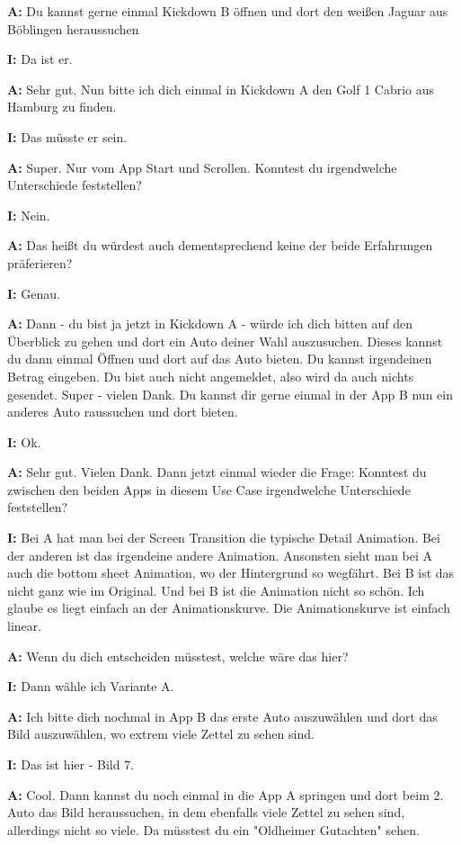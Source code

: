 \begin{myparindent}{0pt}
\textbf{A:} Du kannst gerne einmal Kickdown B öffnen und dort den weißen Jaguar aus Böblingen heraussuchen 

\textbf{I:} Da ist er. 

\textbf{A:} Sehr gut. Nun bitte ich dich einmal in Kickdown A den Golf 1 Cabrio aus Hamburg zu finden. 

\textbf{I:} Das müsste er sein. 

\textbf{A:} Super. Nur vom App Start und Scrollen. Konntest du irgendwelche Unterschiede feststellen?

\textbf{I:} Nein.

\textbf{A:} Das heißt du würdest auch dementsprechend keine der beide Erfahrungen präferieren?

\textbf{I:} Genau.

\textbf{A:} Dann - du bist ja jetzt in Kickdown A - würde ich dich bitten auf den Überblick zu gehen und dort ein Auto deiner Wahl auszusuchen. Dieses kannst du dann einmal Öffnen und dort auf das Auto bieten. Du kannst irgendeinen Betrag eingeben. Du bist auch nicht angemeldet, also wird da auch nichts gesendet. 
Super - vielen Dank. Du kannst dir gerne einmal in der App B nun ein anderes Auto raussuchen und dort bieten.

\textbf{I:} Ok. 

\textbf{A:} Sehr gut. Vielen Dank. Dann jetzt einmal wieder die Frage: Konntest du zwischen den beiden Apps in diesem Use Case irgendwelche Unterschiede feststellen?

\textbf{I:} Bei A hat man bei der Screen Transition die typische Detail Animation. Bei der anderen ist das irgendeine andere Animation. Ansonsten sieht man bei A auch die bottom sheet Animation, wo der Hintergrund so wegfährt. Bei B ist das nicht ganz wie im Original. Und bei B ist die Animation nicht so schön. Ich glaube es liegt einfach an der Animationskurve. Die Animationskurve ist einfach linear.

\textbf{A:} Wenn du dich entscheiden müsstest, welche wäre das hier?

\textbf{I:} Dann wähle ich Variante A.

\textbf{A:} Ich bitte dich nochmal in App B das erste Auto auszuwählen und dort das Bild auszuwählen, wo extrem viele Zettel zu sehen sind. 

 \textbf{I:} Das ist hier - Bild 7. 

\textbf{A:} Cool. Dann kannst du noch einmal in die App A springen und dort beim 2. Auto das Bild heraussuchen, in dem ebenfalls viele Zettel zu sehen sind, allerdings nicht so viele. Da müsstest du ein "Oldheimer Gutachten" sehen.


\end{myparindent}
